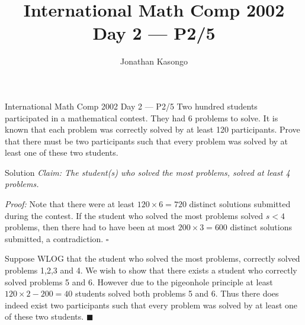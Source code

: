 \documentclass{article}
\author{Jonathan Kasongo}
\title{International Math Comp 2002 Day 2 --- P2/5}
\begin{document}
\maketitle

\begin{problem}{International Math Comp 2002 Day 2 --- P2/5}
Two hundred students participated in a mathematical contest. They had 6
problems to solve. It is known that each problem was correctly solved by at
least 120 participants. Prove that there must be two participants such that
every problem was solved by at least one of these two students.
\end{problem}

\begin{solution}{Solution}
\textit{Claim: The student(s) who solved the most problems, solved
at least 4 problems.}\vspace{0.2cm}

\textit{Proof:} Note that there were at least $120\times 6 = 720$ distinct
solutions submitted during the contest. If the student who solved the most
problems solved $s < 4$ problems, then there had to have been at most
$200\times 3 = 600$ distinct solutions submitted, a contradiction. $\square$
\vspace{0.2cm}

Suppose WLOG that the student who solved the most problems, correctly solved
problems 1,2,3 and 4. We wish to show that there exists a student who
correctly solved problems 5 and 6. However due to the pigeonhole principle
at least $120\times 2 - 200 = 40$ students solved both problems 5 and 6.
Thus there does indeed exist two participants such that every problem
was solved by at least one of these two students. $\blacksquare$
\end{solution}
\end{document}
